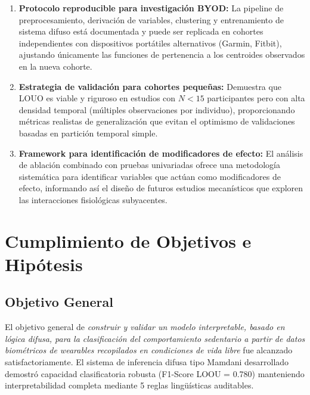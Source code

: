 \begin{enumerate}
    \item \textbf{Protocolo reproducible para investigación BYOD:} La pipeline de preprocesamiento, derivación de variables, clustering y entrenamiento de sistema difuso está documentada y puede ser replicada en cohortes independientes con dispositivos portátiles alternativos (Garmin, Fitbit), ajustando únicamente las funciones de pertenencia a los centroides observados en la nueva cohorte.
    
    \item \textbf{Estrategia de validación para cohortes pequeñas:} Demuestra que LOUO es viable y riguroso en estudios con $N < 15$ participantes pero con alta densidad temporal (múltiples observaciones por individuo), proporcionando métricas realistas de generalización que evitan el optimismo de validaciones basadas en partición temporal simple.
    
    \item \textbf{Framework para identificación de modificadores de efecto:} El análisis de ablación combinado con pruebas univariadas ofrece una metodología sistemática para identificar variables que actúan como modificadores de efecto, informando así el diseño de futuros estudios mecanísticos que exploren las interacciones fisiológicas subyacentes.
\end{enumerate}


\section{Cumplimiento de Objetivos e Hipótesis}
\label{sec:cumplimiento}

\subsection{Objetivo General}
\label{subsec:cumplimiento_og}

El objetivo general de \textit{construir y validar un modelo interpretable, basado en lógica difusa, para la clasificación del comportamiento sedentario a partir de datos biométricos de wearables recopilados en condiciones de vida libre} fue alcanzado satisfactoriamente. El sistema de inferencia difusa tipo Mamdani desarrollado demostró capacidad clasificatoria robusta (F1-Score LOOU = 0.780) manteniendo interpretabilidad completa mediante 5 reglas lingüísticas auditables.


